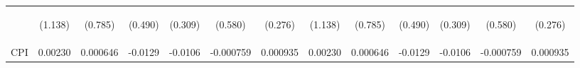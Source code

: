 \documentclass[]{article}
\begin{document}
\begin{center}
\begin{tabular}{lcccccccccccc}
\vspace{4pt} & \begin{footnotesize}(1.138)\end{footnotesize} & \begin{footnotesize}(0.785)\end{footnotesize} & \begin{footnotesize}(0.490)\end{footnotesize} & \begin{footnotesize}(0.309)\end{footnotesize} & \begin{footnotesize}(0.580)\end{footnotesize} & \begin{footnotesize}(0.276)\end{footnotesize} & \begin{footnotesize}(1.138)\end{footnotesize} & \begin{footnotesize}(0.785)\end{footnotesize} & \begin{footnotesize}(0.490)\end{footnotesize} & \begin{footnotesize}(0.309)\end{footnotesize} & \begin{footnotesize}(0.580)\end{footnotesize} & \begin{footnotesize}(0.276)\end{footnotesize} \\
CPI & 0.00230 & 0.000646 & -0.0129 & -0.0106 & -0.000759 & 0.000935 & 0.00230 & 0.000646 & -0.0129 & -0.0106 & -0.000759 & 0.000935 \\

\end{tabular}
\end{center}
\end{document}
